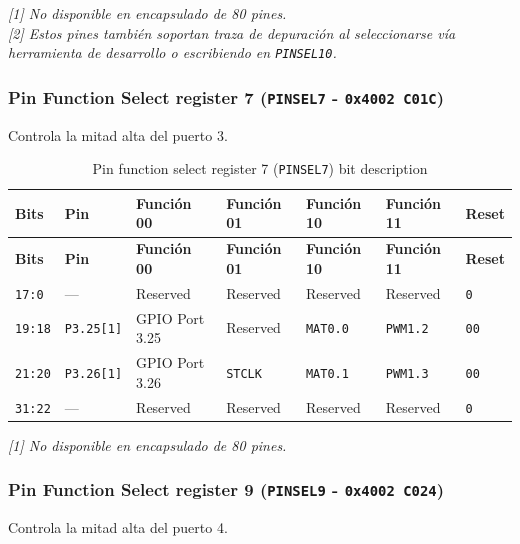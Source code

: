 \noindent\textit{[1] No disponible en encapsulado de 80 pines.}\\
\textit{[2] Estos pines también soportan traza de depuración al seleccionarse vía herramienta de desarrollo o escribiendo en \texttt{PINSEL10}.}

\subsubsection{Pin Function Select register 7 (\texttt{PINSEL7} - \texttt{0x4002 C01C})}
Controla la mitad alta del puerto 3.

\begin{longtable}{|>{\raggedright\arraybackslash}p{}|>{\raggedright\arraybackslash}p{}|>{\raggedright\arraybackslash}p{}|>{\raggedright\arraybackslash}p{}|>{\raggedright\arraybackslash}p{}|>{\raggedright\arraybackslash}p{}|>{\centering\arraybackslash}p{}|}
\caption{Pin function select register 7 (\texttt{PINSEL7}) bit description}\\
\hline
\textbf{Bits} & \textbf{Pin} & \textbf{Función 00} & \textbf{Función 01} & \textbf{Función 10} & \textbf{Función 11} & \textbf{Reset} \\
\hline
\endfirsthead
\hline
\textbf{Bits} & \textbf{Pin} & \textbf{Función 00} & \textbf{Función 01} & \textbf{Función 10} & \textbf{Función 11} & \textbf{Reset} \\
\hline
\endhead
\texttt{17:0} & --- & Reserved & Reserved & Reserved & Reserved & \texttt{0} \\
\hline
\texttt{19:18} & \texttt{P3.25[1]} & GPIO Port 3.25 & Reserved & \texttt{MAT0.0} & \texttt{PWM1.2} & \texttt{00} \\
\hline
\texttt{21:20} & \texttt{P3.26[1]} & GPIO Port 3.26 & \texttt{STCLK} & \texttt{MAT0.1} & \texttt{PWM1.3} & \texttt{00} \\
\hline
\texttt{31:22} & --- & Reserved & Reserved & Reserved & Reserved & \texttt{0} \\
\hline
\end{longtable}
\noindent\textit{[1] No disponible en encapsulado de 80 pines.}

\subsubsection{Pin Function Select register 9 (\texttt{PINSEL9} - \texttt{0x4002 C024})}
Controla la mitad alta del puerto 4.

